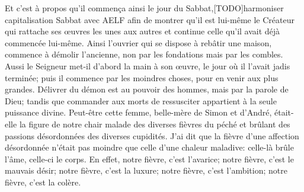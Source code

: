 Et c’est à propos qu’il commença ainsi le jour du Sabbat,[TODO]harmoniser capitalisation Sabbat avec AELF
	afin de montrer qu’il est lui-même le Créateur
	qui rattache ses œuvres les unes aux autres
	et continue celle qu’il avait déjà commencée lui-même.
Ainsi l’ouvrier qui se dispose à rebâtir une maison,
	commence à démolir l’ancienne, non par les fondations
	mais par les combles.
Aussi le Seigneur met-il d’abord la main à son œuvre,
	le jour où il l’avait jadis terminée;
	puis il commence par les moindres choses, pour en venir aux plus grandes.
Délivrer du démon est au pouvoir des hommes, mais par la parole de Dieu;
	tandis que commander aux morts de ressusciter
	appartient à la seule puissance divine.
Peut-être cette femme, belle-mère de Simon et d’André,
	était-elle la figure de notre chair malade des diverses fièvres du péché
	et brûlant des passions désordonnées des diverses cupidités.
J’ai dit que la fièvre d’une affection désordonnée
	n’était pas moindre que celle d’une chaleur maladive:
	celle-là brûle l’âme, celle-ci le corps.
En effet, notre fièvre, c’est l’avarice; notre fièvre, c’est le mauvais désir;
	notre fièvre, c’est la luxure; notre fièvre, c’est l’ambition;
		notre fièvre, c’est la colère.
